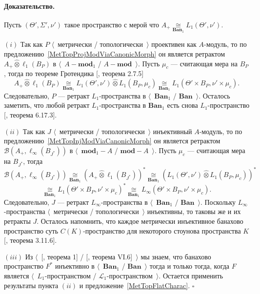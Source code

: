 \documentclass[12pt]{article}
\newcommand{\projtens}{\mathbin{\widehat{\otimes}}}
\newcommand{\isom}[1]{\mathop{\mathbin{\cong}}\limits_{#1}}
\renewenvironment{proof}{\paragraph{Доказательство.}}{\hfill$\square$\medskip}
\begin{document}
\begin{proof} Пусть $(\Theta',\Sigma', \nu')$ такое пространство с мерой что
    $A_+\isom{\mathbf{Ban}_1} L_1(\Theta',\nu')$.

    $(i)$ Так как $P$ $\langle$~метрически / топологически~$\rangle$ проективен
    как $A$-модуль, то по предложению~\ref{MetTopProjModViaCanonicMorph} он
    является ретрактом $A_+\projtens \ell_1(B_P)$ в $\langle$~$A-\mathbf{mod}_1$
    / $A-\mathbf{mod}$~$\rangle$. Пусть $\mu_c$ --- считающая мера на $B_P$,
    тогда по теореме Гротендика [\cite{HelLectAndExOnFuncAn}, теорема 2.7.5]
    $$
        A_+\projtens\ell_1(B_P)
        \isom{\mathbf{Ban}_1}L_1(\Theta',\nu')\projtens L_1(B_P,\mu_c)
        \isom{\mathbf{Ban}_1}L_1(\Theta'\times B_P,\nu'\times \mu_c).
    $$
    Следовательно, $P$ --- ретракт $L_1$-пространства в
    $\langle$~$\mathbf{Ban}_1$ / $\mathbf{Ban}$~$\rangle$. Осталось заметить,
    что любой ретракт $L_1$-пространства в $\mathbf{Ban}_1$ есть снова
    $L_1$-пространство [\cite{LaceyIsomThOfClassicBanSp}, теорема 6.17.3].

    $(ii)$ Так как $J$ $\langle$~метрически / топологически~$\rangle$
    инъективный $A$-модуль, то по предложению~\ref{MetTopInjModViaCanonicMorph}
    он является ретрактом $\mathcal{B}(A_+,\ell_\infty(B_{J^*}))$ в
    $\langle$~$\mathbf{mod}_1-A$ / $\mathbf{mod}-A$~$\rangle$. Пусть $\mu_c$ ---
    считающая мера на $B_{J^*}$, тогда
    $$
        \mathcal{B}(A_+,\ell_\infty(B_{J^*}))
        \isom{\mathbf{Ban}_1}
        {(A_+\projtens \ell_1(B_{J^*}))}^*
        \isom{\mathbf{Ban}_1}
        {(L_1(\Theta',\nu')\projtens L_1(B_P,\mu_c))}^*
    $$
    $$
        \isom{\mathbf{Ban}_1}
        {L_1(\Theta'\times B_P,\nu'\times \mu_c)}^*
        \isom{\mathbf{Ban}_1}
        L_\infty(\Theta'\times B_P,\nu'\times \mu_c).
    $$
    Следовательно, $J$ --- ретракт $L_\infty$-пространства в
    $\langle$~$\mathbf{Ban}_1$ / $\mathbf{Ban}$~$\rangle$. Поскольку
    $L_\infty$-пространства $\langle$~метрически / топологически~$\rangle$
    инъективны, то таковы же и их ретракты $J$. Осталось напомнить, что каждое
    метрически инъективное банахово пространство суть $C(K)$-пространство для
    некоторого стоунова пространства $K$ [\cite{LaceyIsomThOfClassicBanSp},
            теорема 3.11.6].

    $(iii)$ Из $\langle$~[\cite{GrothMetrProjFlatBanSp}, теорема 1] /
    [\cite{StegRethNucOpL1LInfSp}, теорема VI.6]~$\rangle$ мы знаем, что
    банахово пространство $F^*$ инъективно в $\langle$~$\mathbf{Ban}_1$ /
    $\mathbf{Ban}$~$\rangle$ тогда и только тогда, когда $F$ является
    $\langle$~$L_1$-пространством / $\mathscr{L}_1$-пространством~$\rangle$.
    Остается применить результаты пункта $(ii)$ и
    предложение~\ref{MetTopFlatCharac}.
\end{proof}
\end{document}
